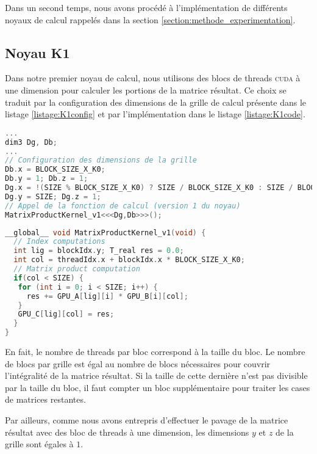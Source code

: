 \documentclass[11pt, twocolumn]{article}
\begin{document}
Dans un second temps, nous avons procédé à l'implémentation de différents noyaux de calcul rappelés dans la section \ref{section:methode_experimentation}.

\subsection{Noyau K1}

Dans notre premier noyau de calcul, nous utilisons des blocs de threads \textsc{cuda} à une dimension pour calculer les portions de la matrice résultat. Ce choix se traduit par la configuration des dimensions de la grille de calcul présente dans le listage \ref{listage:K1config} et par l'implémentation dans le listage \ref{listage:K1code}.

\begin{lstlisting}[language=C, morekeywords={dim3}, label={listage:K1config}, caption={Configuration des dimensions de la grille de calcul pour \textit{K1}}]
...
dim3 Dg, Db;
...
// Configuration des dimensions de la grille
Db.x = BLOCK_SIZE_X_K0; 
Db.y = 1; Db.z = 1;
Dg.x = !(SIZE % BLOCK_SIZE_X_K0) ? SIZE / BLOCK_SIZE_X_K0 : SIZE / BLOCK_SIZE_X_K0 + 1;
Dg.y = SIZE; Dg.z = 1;
// Appel de la fonction de calcul (version 1 du noyau)
MatrixProductKernel_v1<<<Dg,Db>>>();
\end{lstlisting}

\begin{lstlisting}[language=C, morekeywords={__global__}, label={listage:K1code}, caption={Implémentation du noyau \textit{K1}}]
__global__ void MatrixProductKernel_v1(void) {
  // Index computations
  int lig = blockIdx.y; T_real res = 0.0;
  int col = threadIdx.x + blockIdx.x * BLOCK_SIZE_X_K0;
  // Matrix product computation
  if(col < SIZE) {
   for (int i = 0; i < SIZE; i++) {
     res += GPU_A[lig][i] * GPU_B[i][col];
   }
   GPU_C[lig][col] = res;
  }
}
\end{lstlisting}

En fait, le nombre de threads par bloc correspond à la taille du bloc. Le nombre de blocs par grille est égal au nombre de blocs nécessaires pour couvrir l'intégralité de la matrice résultat. Si la taille de cette dernière n'est pas divisible par la taille du bloc, il faut compter un bloc supplémentaire pour traiter les cases de matrices restantes.

\par Par ailleurs, comme nous avons entrepris d'effectuer le pavage de la matrice résultat avec des bloc de threads à une dimension, les dimensions $y$ et $z$ de la grille sont égales à $1$.
\end{document}
